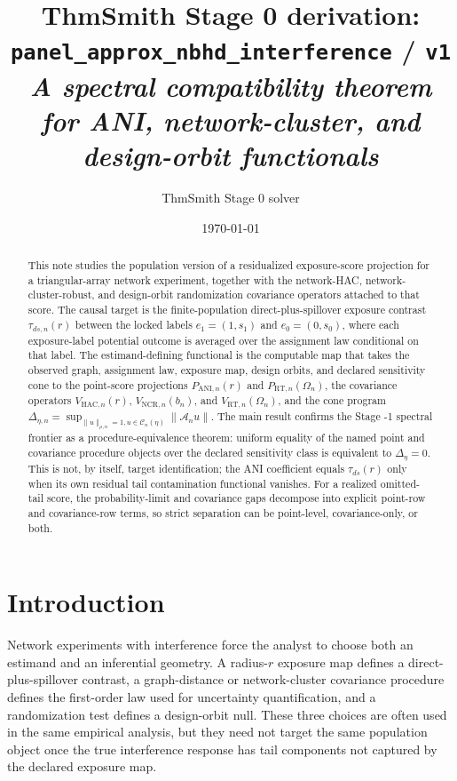 \documentclass[11pt]{article}
\title{ThmSmith Stage 0 derivation: \texttt{panel\_approx\_nbhd\_interference} / \texttt{v1}%
  \\ \large\textit{A spectral compatibility theorem for ANI, network-cluster, and design-orbit functionals}}
\author{ThmSmith Stage 0 solver}
\date{\today}
\theoremstyle{definition}
\theoremstyle{plain}
\theoremstyle{remark}
\begin{document}
\maketitle


\begin{abstract}
This note studies the population version of a residualized exposure-score
projection for a triangular-array network experiment, together with the
network-HAC, network-cluster-robust, and design-orbit randomization covariance
operators attached to that score.  The causal target is the finite-population
direct-plus-spillover exposure contrast \(\tau_{ds,n}(r)\) between the locked
labels \(e_1=(1,s_1)\) and \(e_0=(0,s_0)\), where each exposure-label potential
outcome is averaged over the assignment law conditional on that label.  The
estimand-defining functional is the computable map that takes the observed
graph, assignment law, exposure map, design orbits, and declared sensitivity
cone to the point-score projections \(P_{\mathrm{ANI},n}(r)\) and
\(P_{\mathrm{RT},n}(\Omega_n)\), the covariance operators
\(V_{\mathrm{HAC},n}(r)\), \(V_{\mathrm{NCR},n}(b_n)\), and
\(V_{\mathrm{RT},n}(\Omega_n)\), and the cone program
\(\Delta_{\eta,n}=\sup_{\|u\|_{\rho,n}=1,u\in\mathcal C_n(\eta)}
\|\mathcal A_nu\|\).  The main result confirms the Stage -1 spectral frontier
as a procedure-equivalence theorem: uniform equality of the named point and
covariance procedure objects over the declared sensitivity class is equivalent
to \(\Delta_\eta=0\).  This is not, by itself, target identification; the ANI
coefficient equals \(\tau_{ds}(r)\) only when its own residual tail
contamination functional vanishes.  For a realized omitted-tail score, the
probability-limit and covariance gaps decompose into explicit point-row and
covariance-row terms, so strict separation can be point-level,
covariance-only, or both.
\end{abstract}

\section{Introduction}
Network experiments with interference force the analyst to choose both an
estimand and an inferential geometry.  A radius-\(r\) exposure map defines a
direct-plus-spillover contrast, a graph-distance or network-cluster covariance
procedure defines the first-order law used for uncertainty quantification, and
a randomization test defines a design-orbit null.  These three choices are
often used in the same empirical analysis, but they need not target the same
population object once the true interference response has tail components not
captured by the declared exposure map.
\end{document}

